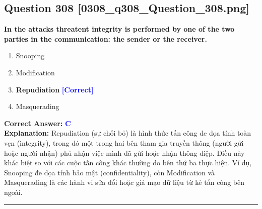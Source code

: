 \documentclass[11pt,a4paper]{article}
\begin{document}
\begin{minipage}{\textwidth}
\subsection*{Question 308 \quad \footnotesize{[0308\_q308\_Question\_308.png]}}
\noindent \textbf{In the attacks threatent integrity is performed by one of the two parties in the communication: the sender or the receiver.}

\begin{enumerate}[label=\Alph*.]
    \item Snooping
    \item Modification
    \item \textbf{Repudiation} \hfill \textcolor{blue}{\textbf{[Correct]}}
    \item Masquerading
\end{enumerate}

\noindent \textbf{Correct Answer:} \textcolor{blue}{\textbf{C}} \\[2pt]
\noindent \textbf{Explanation:} Repudiation (sự chối bỏ) là hình thức tấn công đe dọa tính toàn vẹn (integrity), trong đó một trong hai bên tham gia truyền thông (người gửi hoặc người nhận) phủ nhận việc mình đã gửi hoặc nhận thông điệp. Điều này khác biệt so với các cuộc tấn công khác thường do bên thứ ba thực hiện. Ví dụ, Snooping đe dọa tính bảo mật (confidentiality), còn Modification và Masquerading là các hành vi sửa đổi hoặc giả mạo dữ liệu từ kẻ tấn công bên ngoài.

\par\vspace{0.3cm}
\hrule
\vspace{0.3cm}
\end{minipage}
\end{document}
